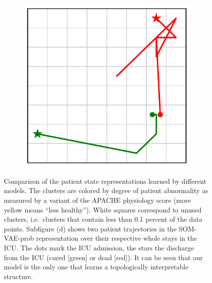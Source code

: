 \begin{figure}
\begin{subfigure}[t]{0.22\textwidth}
\centering
\includegraphics[scale=0.31]{patient_trajectory_example.pdf}
\label{fig:patient_trajectories}
\end{subfigure}
\caption{Comparison of the patient state representations learned by different models. The clusters are colored by degree of patient abnormality as measured by a variant of the APACHE physiology score (more yellow means ``less healthy'').
White squares correspond to unused clusters, i.e.\ clusters that contain less than 0.1 percent of the data points.
Subfigure (d) shows two patient trajectories in the SOM-VAE-prob representation over their respective whole stays in the ICU.
The dots mark the ICU admission, the stars the discharge from the ICU (cured [green] or dead [red]).
It can be seen that our model is the only one that learns a topologically interpretable structure.
}
\label{fig:heatmaps}
\end{figure}



\usepackage[utf8]{inputenc} %
\usepackage[T1]{fontenc}    %
\usepackage{booktabs}       %
\usepackage{amsfonts}       %
\usepackage{amsmath}
\usepackage{dsfont}
\usepackage{nicefrac}       %
\usepackage{microtype}      %
\usepackage{siunitx}
\usepackage{color}
\usepackage{graphicx}
\usepackage{tabularx}
\usepackage{caption}
\usepackage{subcaption}
\usepackage[english]{babel}
\usepackage{placeins}
\usepackage{algorithm}
\usepackage{algorithmicx}
\usepackage{algpseudocode}
\usepackage{url}

